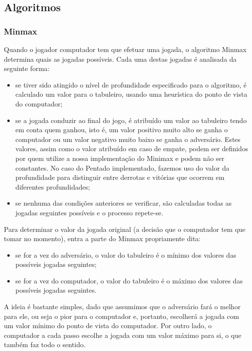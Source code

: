 
\subsection{Algoritmos}

\subsubsection{Minmax}

Quando o jogador computador tem que efetuar uma jogada, o algoritmo Minmax determina quais as jogadas possíveis. Cada uma destas jogadas é analisada da seguinte forma:
\begin{itemize}
	\item se tiver sido atingido o nível de profundidade especificado para o algoritmo, é calculado um valor para o tabuleiro, usando uma heurística do ponto de vista do computador;
	\item se a jogada conduzir ao final do jogo, é atribuído um valor ao tabuleiro tendo em conta quem ganhou, isto é, um valor positivo muito alto se ganha o computador ou um valor negativo muito baixo se ganha o adversário. Estes valores, assim como o valor atribuído em caso de empate, podem ser definidos por quem utilize a nossa implementação do Minimax e podem não ser constantes. No caso do Pentado implementado, fazemos uso do valor da profundidade para distinguir entre derrotas e vitórias que ocorrem em diferentes profundidades;
	\item se nenhuma das condições anteriores se verificar, são calculadas todas as jogadas seguintes possíveis e o processo repete-se.
\end{itemize}
Para determinar o valor da jogada original (a decisão que o computador tem que tomar no momento), entra a parte do Minmax propriamente dita:
\begin{itemize}
	\item se for a vez do adversário, o valor do tabuleiro é o mínimo dos valores das possíveis jogadas seguintes;
	\item se for a vez do computador, o valor do tabuleiro é o máximo dos valores das possíveis jogadas seguintes.
\end{itemize}

A ideia é bastante simples, dado que assumimos que o adversário fará o melhor para ele, ou seja o pior para o computador e, portanto, escolherá a jogada com um valor mínimo do ponto de vista do computador. Por outro lado, o computador a cada passo escolhe a jogada com um valor máximo para si, o que também faz todo o sentido.

